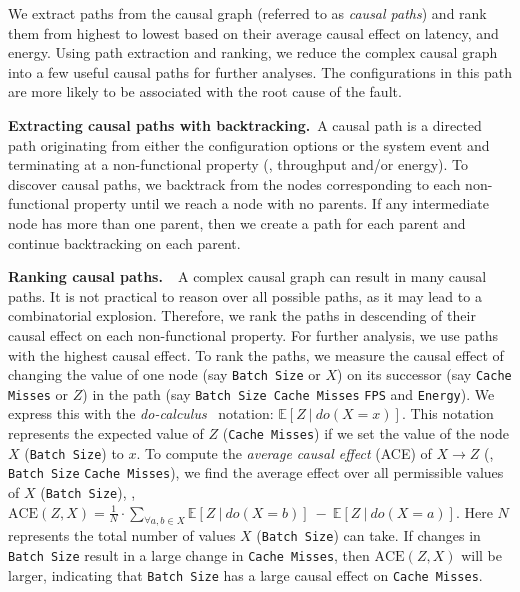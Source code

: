 We extract paths from the causal graph (referred to as \textit{causal paths}) and rank them from highest to lowest based on their average causal effect on latency, and energy. Using path extraction and ranking, we reduce the complex causal graph into a few useful causal paths for further analyses. The configurations in this path are more likely to be associated with the root cause of the fault.

\noindent\textbf{Extracting causal paths with backtracking.}~A causal path is a directed path originating from either the configuration options or the system event and terminating at a non-functional property (\ie, throughput and/or energy). To discover causal paths, we backtrack from the nodes corresponding to each non-functional property until we reach a node with no parents. If any intermediate node has more than one parent, then we create a path for each parent and continue backtracking on each parent. 


\noindent\textbf{Ranking causal paths.~}~A complex causal graph can result in many causal paths. It is not practical to reason over all possible paths, as it may lead to a combinatorial explosion. Therefore, we rank the paths in descending of their causal effect on each non-functional property. For further analysis, we use paths with the highest causal effect.
To rank the paths, we measure the causal effect of changing the value of one node (say \texttt{Batch Size} or $X$) on its successor (say \texttt{Cache Misses} or $Z$) in the path (say \texttt{Batch Size}~\edgeone \texttt{Cache Misses} \edgeone \texttt{FPS} and \texttt{Energy}). We express this with the \textit{do-calculus}~\cite{pearl2009causality} notation: $\mathbb{E}[Z~|~\mathit{do}(X=x)]$. This notation represents the expected value of $Z$ (\texttt{Cache Misses}) if we set the value of the node $X$ (\texttt{Batch Size}) to $x$. To compute the \textit{average causal effect} (ACE) of $X\rightarrow Z$ (\ie, \texttt{Batch Size} \edgeone \texttt{Cache Misses}), we find the average effect over all permissible values of $X$ (\texttt{Batch Size}), \ie, $\mathrm{ACE}\left(Z, X\right) = \frac{1}{N}\cdot \sum_{\forall a, b\in X}\mathbb{E}\left[Z~|~\mathit{do}\left(X=b\right)\right]~-~ \mathbb{E}\left[Z~|~\mathit{do}\left(X=a\right)\right]$.  Here $N$ represents the total number of values $X$ (\texttt{Batch Size}) can take. If changes in \texttt{Batch Size} result in a large change in \texttt{Cache Misses}, then $\mathrm{ACE}\left(Z, X\right)$ will be larger, indicating that \texttt{Batch Size} has a large causal effect on \texttt{Cache Misses}.

